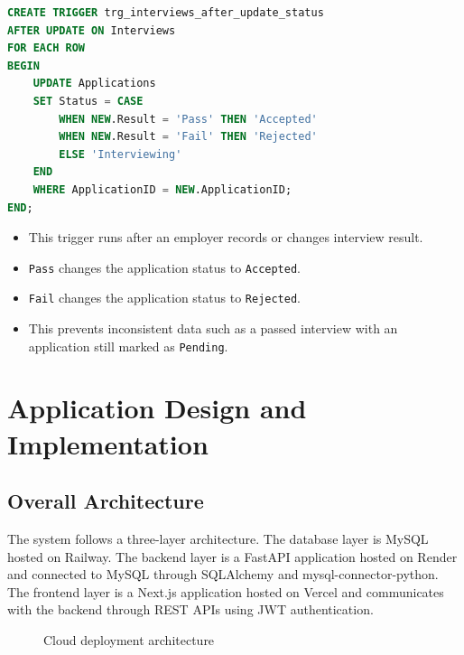 \documentclass[11pt,a4paper]{report}
\begin{document}
\begin{lstlisting}[language=SQL,caption={Trigger after updating an interview}]
CREATE TRIGGER trg_interviews_after_update_status
AFTER UPDATE ON Interviews
FOR EACH ROW
BEGIN
    UPDATE Applications
    SET Status = CASE
        WHEN NEW.Result = 'Pass' THEN 'Accepted'
        WHEN NEW.Result = 'Fail' THEN 'Rejected'
        ELSE 'Interviewing'
    END
    WHERE ApplicationID = NEW.ApplicationID;
END;
\end{lstlisting}

\begin{itemize}[leftmargin=1.2cm,itemsep=0.1em]
  \item This trigger runs after an employer records or changes interview result.
  \item \texttt{Pass} changes the application status to \texttt{Accepted}.
  \item \texttt{Fail} changes the application status to \texttt{Rejected}.
  \item This prevents inconsistent data such as a passed interview with an application still marked as \texttt{Pending}.
\end{itemize}

\chapter{Application Design and Implementation}

\section{Overall Architecture}

The system follows a three-layer architecture. The database layer is MySQL hosted on Railway. The backend layer is a FastAPI application hosted on Render and connected to MySQL through SQLAlchemy and mysql-connector-python. The frontend layer is a Next.js application hosted on Vercel and communicates with the backend through REST APIs using JWT authentication.

\begin{figure}[H]
\centering
{}
\caption{Cloud deployment architecture}
\label{fig:deployment-architecture}
\end{figure}
\end{document}
